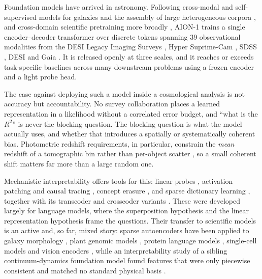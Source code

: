 \documentclass[11pt]{article}
\newcommand{\aion}{AION-1}
\begin{document}
Foundation models have arrived in astronomy. Following cross-modal and self-supervised models
for galaxies \citep{parker2024astroclip,smith2024astropt,rizhko2025astrom3,leung2024stars} and
the assembly of large heterogeneous corpora \citep{mmu2024multimodal}, and cross-domain scientific pretraining more broadly \citep{mccabe2023mpp,mccabe2025walrus}, \aion{}
\citep{parker2025aion} trains a single encoder--decoder transformer over discrete tokens
spanning 39 observational modalities from the DESI Legacy Imaging Surveys
\citep{dey2019legacy}, Hyper Suprime-Cam \citep{aihara2018hsc,aihara2022hscpdr3}, SDSS
\citep{york2000sdss}, DESI \citep{desi2016experiment,abareshi2022desiinstrument,desi2024edr,desi2025dr1} and Gaia
\citep{gaia2016mission,gaia2023dr3}. It is released openly at three scales, and it reaches or
exceeds task-specific baselines across many downstream problems using a frozen encoder and a
light probe head.

The case against deploying such a model inside a cosmological analysis is not accuracy but
accountability. No survey collaboration places a learned representation in a likelihood without
a correlated error budget, and ``what is the $R^2$'' is never the blocking question. The
blocking question is what the model actually uses, and whether that introduces a spatially or
systematically coherent bias. Photometric redshift requirements, in particular, constrain the
\emph{mean} redshift of a tomographic bin rather than per-object scatter
\citep{lsstdesc2018srd,newman2022photoz}, so a small coherent shift matters far more than a
large random one.

Mechanistic interpretability offers tools for this: linear probes
\citep{alain2016understanding,belinkov2022probing}, activation patching and causal tracing
\citep{vig2020causal,meng2022locating}, concept erasure \citep{ravfogel2020null,belrose2023leace},
and sparse dictionary learning
\citep{cunningham2023sparse,gao2024scaling,bussmann2024batchtopk,rajamanoharan2024jumping},
together with its transcoder and crosscoder variants \citep{dunefsky2024transcoders,lindsey2024crosscoders}.
These were developed largely for language models, where the superposition hypothesis
\citep{elhage2022toy} and the linear representation hypothesis \citep{park2024linear} frame the
questions. Their transfer to scientific models is an active and, so far, mixed story: sparse
autoencoders have been applied to galaxy morphology
\citep{wu2025euclid,wu2025sparsefeature}, plant genomic models
\citep{kendiukhov2027plant}, protein language
models \citep{simon2025interplm}, single-cell models \citep{pedrocchi2025singlecell} and vision
encoders \citep{zaigrajew2025clip}, while an interpretability study of a sibling
continuum-dynamics foundation model found features that were only piecewise consistent and
matched no standard physical basis \citep{rosenfeld2026sparse}.
\end{document}
